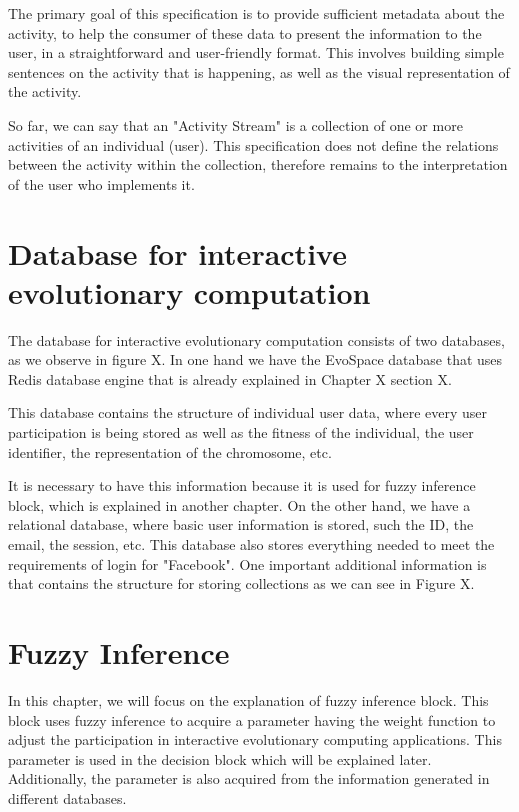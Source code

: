 The primary goal of this specification is to provide sufficient metadata about the activity, to help the consumer of these data to present the information to the user, in a straightforward and user-friendly format. This involves building simple sentences on the activity that is happening, as well as the visual representation of the activity.

So far, we can say that an "Activity Stream" is a collection of one or more activities of an individual (user).
This specification does not define the relations between the activity within the collection, therefore remains to the interpretation of the user who implements it.

\section{Database for interactive evolutionary computation}
The database for interactive evolutionary computation consists of two databases, as we observe in figure X. In one hand we have the EvoSpace database that uses Redis database engine that is already explained in Chapter X section X.

This database contains the structure of individual user data, where every user participation is being stored as well as the fitness of the individual, the user identifier, the representation of the chromosome, etc. 

It is necessary to have this information because it is used for fuzzy inference block, which is explained in another chapter. On the other hand, we have a relational database, where basic user information is stored, such the ID, the email, the session, etc. This database also stores everything needed to meet the requirements of login for "Facebook". One important additional information is that contains the structure for storing collections as we can see in Figure X.

\section{Fuzzy Inference}
In this chapter, we will focus on the explanation of fuzzy inference block. This block uses fuzzy inference to acquire a parameter having the weight function to adjust the participation in interactive evolutionary computing applications. This parameter is used in the decision block which will be explained later. Additionally, the parameter is also acquired from the information generated in different databases.

